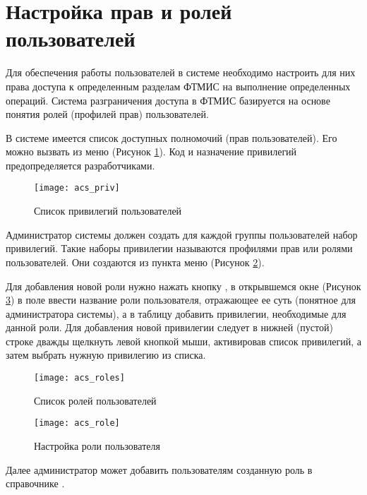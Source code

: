 \newpage
\section{Настройка прав и ролей пользователей }

Для обеспечения работы пользователей в системе необходимо настроить для них права доступа к определенным разделам ФТМИС на выполнение определенных операций. Система разграничения доступа в ФТМИС базируется на основе понятия ролей (профилей прав) пользователей.

В системе имеется список доступных полномочий (прав пользователей). Его можно вызвать из меню  (Рисунок \ref{img_acs_priv}). Код и назначение привилегий предопределяется разработчиками.

\begin{figure}[ht]\centering
 \texttt{[image: acs\_priv]}
 \caption{Список привилегий пользователей}
 \label{img_acs_priv}
\end{figure}

Администратор системы должен создать для каждой группы пользователей набор привилегий. Такие наборы привилегии называются профилями прав или ролями пользователей. Они создаются из пункта меню  (Рисунок \ref{img_acs_roles}).

Для добавления новой роли нужно нажать кнопку , в открывшемся окне (Рисунок \ref{img_acs_role}) в поле  ввести название роли пользователя, отражающее ее суть (понятное для администратора системы), а в таблицу  добавить привилегии, необходимые для данной роли. Для добавления новой привилегии следует в нижней (пустой) строке дважды щелкнуть левой кнопкой мыши, активировав список привилегий, а затем выбрать нужную привилегию из списка. 

\begin{figure}[ht]\centering
 \texttt{[image: acs\_roles]}
 \caption{Список ролей пользователей}
 \label{img_acs_roles}
\end{figure}

\begin{figure}[ht]\centering
 \texttt{[image: acs\_role]}
 \caption{Настройка роли пользователя}
 \label{img_acs_role}
\end{figure}

Далее администратор может добавить пользователям созданную роль в справочнике .

